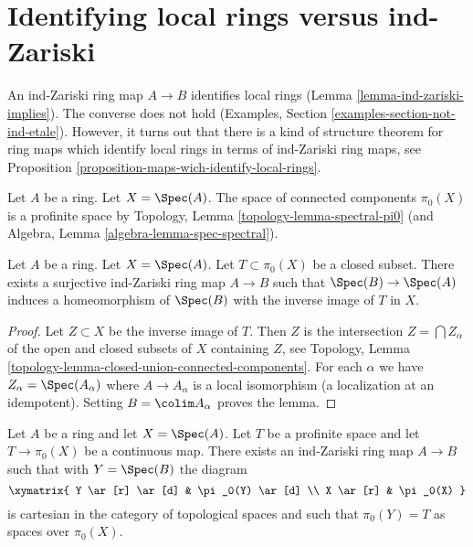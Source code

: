 \section{Identifying local rings versus ind-Zariski}
\label{section-connected-components}

\noindent
An ind-Zariski ring map $A \to B$ identifies local rings
(Lemma \ref{lemma-ind-zariski-implies}). The converse does not hold
(Examples, Section \ref{examples-section-not-ind-etale}).
However, it turns out that there is a kind of structure theorem for
ring maps which identify local rings in terms of ind-Zariski
ring maps, see Proposition \ref{proposition-maps-wich-identify-local-rings}.

\medskip\noindent
Let $A$ be a ring. Let $X = \Spec(A)$. The space of connected
components $\pi_0(X)$ is a profinite space by
Topology, Lemma \ref{topology-lemma-spectral-pi0}
(and Algebra, Lemma \ref{algebra-lemma-spec-spectral}).

\begin{lemma}
\label{lemma-construct}
Let $A$ be a ring. Let $X = \Spec(A)$. Let $T \subset \pi_0(X)$ be a
closed subset. There exists a surjective ind-Zariski ring map $A \to B$
such that $\Spec(B) \to \Spec(A)$ induces a homeomorphism of $\Spec(B)$
with the inverse image of $T$ in $X$.
\end{lemma}

\begin{proof}
Let $Z \subset X$ be the inverse image of $T$. Then $Z$ is the intersection
$Z = \bigcap Z_\alpha$ of the open and closed subsets of $X$ containing $Z$,
see Topology, Lemma \ref{topology-lemma-closed-union-connected-components}.
For each $\alpha$ we have $Z_\alpha = \Spec(A_\alpha)$ where
$A \to A_\alpha$ is a local isomorphism (a localization at an idempotent).
Setting $B = \colim A_\alpha$ proves the lemma.
\end{proof}

\begin{lemma}
\label{lemma-construct-profinite}
Let $A$ be a ring and let $X = \Spec(A)$. Let $T$ be a profinite space and
let $T \to \pi_0(X)$ be a continuous map. There exists an
ind-Zariski ring map $A \to B$ such that with $Y = \Spec(B)$ the diagram
$$
\xymatrix{
Y \ar[r] \ar[d] & \pi_0(Y) \ar[d] \\
X \ar[r] & \pi_0(X)
}
$$
is cartesian in the category of topological spaces and such that
$\pi_0(Y) = T$ as spaces over $\pi_0(X)$.
\end{lemma}

